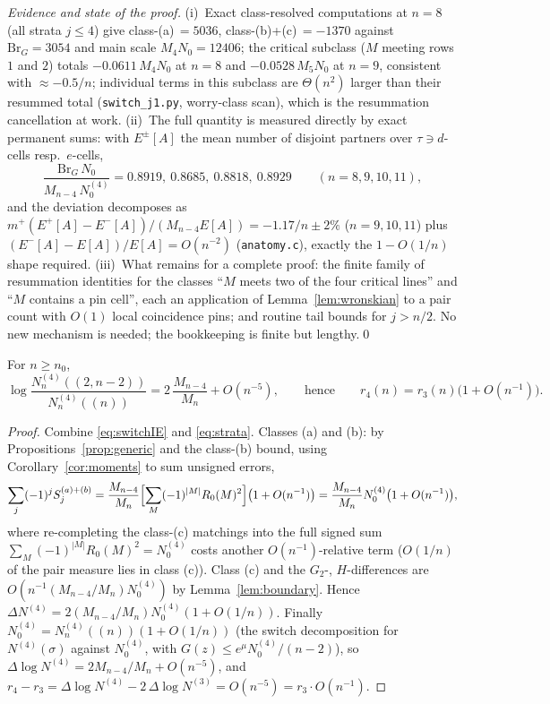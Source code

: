 \noindent\emph{Evidence and state of the proof.}
(i)~Exact class-resolved computations at $n=8$ (all strata $j\le4$) give
class-(a)$\,=5036$, class-(b)+(c)$\,=-1370$ against
$\mathrm{Br}_G=3054$ and main scale $M_4N_0=12406$; the critical
subclass ($M$ meeting rows $1$ and $2$) totals $-0.0611\,M_4N_0$ at
$n=8$ and $-0.0528\,M_5N_0$ at $n=9$, consistent with $\approx-0.5/n$;
individual terms in this subclass are $\Theta(n^2)$ larger than their
resummed total (\texttt{switch\_j1.py}, worry-class scan), which is the
resummation cancellation at work.
(ii)~The full quantity is measured directly by exact permanent sums:
with $E^\pm[A]$ the mean number of disjoint partners over
$\tau\ni d$-cells resp.\ $e$-cells,
\[
\frac{\mathrm{Br}_G\,N_0}{M_{n-4}\,N^{(4)}_0}
=0.8919,\ 0.8685,\ 0.8818,\ 0.8929
\qquad(n=8,9,10,11),
\]
and the deviation decomposes as
$m^+(E^+[A]-E^-[A])/(M_{n-4}E[A])=-1.17/n\pm2\%$ ($n=9,10,11$) plus
$(E^-[A]-E[A])/E[A]=O(n^{-2})$ (\texttt{anatomy.c}), exactly the
$1-O(1/n)$ shape required.
(iii)~What remains for a complete proof: the finite family of
resummation identities for the classes ``$M$ meets two of the four
critical lines'' and ``$M$ contains a pin cell'', each an application of
Lemma~\ref{lem:wronskian} to a pair count with $O(1)$ local coincidence
pins; and routine tail bounds for $j>n/2$.  No new mechanism is needed;
the bookkeeping is finite but lengthy.\qed

\begin{theorem}\label{thm:layer4}
For $n\ge n_0$,
\[
\log\frac{N^{(4)}_n((2,n{-}2))}{N^{(4)}_n((n))}
=2\,\frac{M_{n-4}}{M_n}+O(n^{-5}),
\qquad\text{hence}\qquad
r_4(n)=r_3(n)\bigl(1+O(n^{-1})\bigr).
\]
\end{theorem}

\begin{proof}
Combine \eqref{eq:switchIE} and \eqref{eq:strata}.  Classes (a) and (b):
by Propositions~\ref{prop:generic} and the class-(b) bound, using
Corollary~\ref{cor:moments} to sum unsigned errors,
\[
\sum_j(-1)^jS_j^{(a)+(b)}
=\frac{M_{n-4}}{M_n}\Bigl[\sum_M(-1)^{|M|}R_0(M)^2\Bigr]\bigl(1+O(n^{-1})\bigr)
=\frac{M_{n-4}}{M_n}N^{(4)}_0\bigl(1+O(n^{-1})\bigr),
\]
where re-completing the class-(c) matchings into the full signed sum
$\sum_M(-1)^{|M|}R_0(M)^2=N^{(4)}_0$ costs another
$O(n^{-1})$-relative term ($O(1/n)$ of the pair measure lies in class
(c)).  Class (c) and the $G_2$-, $H$-differences are
$O(n^{-1}(M_{n-4}/M_n)N^{(4)}_0)$ by Lemma~\ref{lem:boundary}.  Hence
$\Delta N^{(4)}=2(M_{n-4}/M_n)N^{(4)}_0(1+O(1/n))$.  Finally
$N^{(4)}_0=N^{(4)}_n((n))(1+O(1/n))$ (the switch decomposition for
$N^{(4)}(\sigma)$ against $N^{(4)}_0$, with $G(z)\le e^{\mu}N^{(4)}_0/
(n-2)$), so $\Delta\log N^{(4)}=2M_{n-4}/M_n+O(n^{-5})$, and
$r_4-r_3=\Delta\log N^{(4)}-2\,\Delta\log N^{(3)}
=O(n^{-5})=r_3\cdot O(n^{-1})$.
\end{proof}

